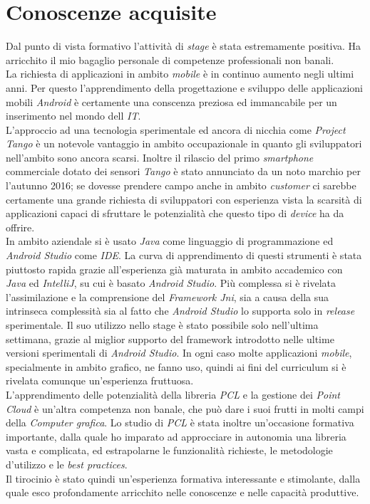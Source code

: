 \section{Conoscenze acquisite}
Dal punto di vista formativo l'attività di \emph{stage} è stata estremamente positiva. Ha arricchito il mio bagaglio personale di competenze professionali non banali.\\

\noindent
La richiesta di applicazioni in ambito \emph{mobile} è in continuo aumento negli ultimi anni. Per questo l'apprendimento della progettazione e sviluppo delle applicazioni mobili \emph{Android} è certamente una conscenza preziosa ed immancabile per un inserimento nel mondo dell \emph{IT}.\\
\noindent
L'approccio ad una tecnologia sperimentale ed ancora di nicchia come \emph{Project Tango} è un notevole vantaggio in ambito occupazionale in quanto gli sviluppatori nell'ambito sono ancora scarsi. Inoltre il rilascio del primo \emph{smartphone} commerciale dotato dei sensori \emph{Tango} è stato annunciato da un noto marchio per l'autunno 2016; se dovesse prendere campo anche in ambito \emph{customer} ci sarebbe certamente una grande richiesta di sviluppatori con esperienza vista la scarsità di applicazioni capaci di sfruttare le potenzialità che questo tipo di \emph{device} ha da offrire.\\
\noindent
In ambito aziendale si è usato \emph{Java} come linguaggio di programmazione ed \emph{Android Studio} come \emph{IDE}. La curva di apprendimento di questi strumenti è stata piuttosto rapida grazie all'esperienza già maturata in ambito accademico con \emph{Java} ed \emph{IntelliJ}, su cui è basato \emph{Android Studio}. Più complessa si è rivelata l'assimilazione e la comprensione del \emph{Framework Jni}, sia a causa della sua intrinseca complessità sia al fatto che \emph{Android Studio} lo supporta solo in \emph{release} sperimentale. Il suo utilizzo nello stage è stato possibile solo nell'ultima settimana, grazie al miglior supporto del framework introdotto nelle ultime versioni sperimentali di \emph{Android Studio}. In ogni caso molte applicazioni \emph{mobile}, specialmente in ambito grafico, ne fanno uso, quindi ai fini del curriculum si è rivelata comunque un'esperienza fruttuosa.\\
\noindent
L'apprendimento delle potenzialità della libreria \emph{PCL} e la gestione dei \emph{Point Cloud} è un'altra competenza non banale, che può dare i suoi frutti in molti campi della \emph{Computer grafica}. Lo studio di \emph{PCL} è stata inoltre un'occasione formativa importante, dalla quale ho imparato ad approcciare in autonomia una libreria vasta e complicata, ed estrapolarne le funzionalità richieste, le metodologie d'utilizzo e le \emph{best practices}.\\

\noindent
Il tirocinio è stato quindi un'esperienza formativa interessante e stimolante, dalla quale esco profondamente arricchito nelle conoscenze e nelle capacità produttive.
